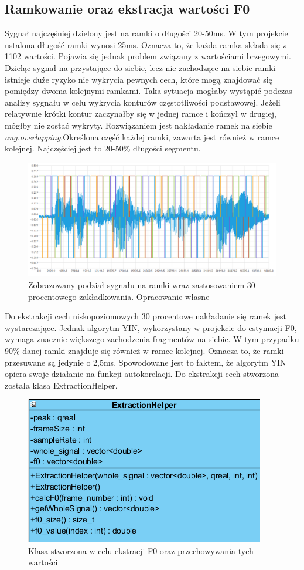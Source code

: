 \documentclass[a4paper,12 pt]{report}
\begin{document}
\subsection{Ramkowanie oraz ekstracja wartości F0}
Sygnał najczęśniej dzielony jest na ramki o długości 20-50ms. W tym projekcie ustalona długość ramki wynosi 25ms. Oznacza to, że każda ramka składa się z 1102 wartości.
Pojawia się jednak problem związany z wartościami brzegowymi. Dzieląc sygnał na przystające do siebie, lecz nie zachodzące na siebie ramki istnieje duże ryzyko nie wykrycia pewnych cech, które mogą znajdować się pomiędzy dwoma kolejnymi ramkami. 
Taka sytuacja mogłaby wystąpić podczas analizy sygnału w celu wykrycia konturów częstotliwości podstawowej. Jeżeli relatywnie krótki kontur zaczynałby się w jednej ramce i kończył w drugiej, mógłby nie zostać wykryty.
Rozwiązaniem jest nakładanie ramek na siebie \textit{ang.overlapping}.Określona część każdej ramki, zawarta jest również w ramce kolejnej. Najczęściej jest to 20-50\% długości segmentu.
\begin{figure}[h]
\includegraphics[scale=0.7]{overlapping.png}
\caption{Zobrazowany podział sygnału na ramki wraz zastosowaniem 30-procentowego zakładkowania. Opracowanie własne}
\end{figure}
\FloatBarrier
Do ekstrakcji cech niskopoziomowych 30 procentowe nakładanie się ramek jest wystarczające. Jednak algorytm YIN, wykorzystany w projekcie do estymacji F0, wymaga znacznie większego zachodzenia fragmentów na siebie. W tym przypadku 90\% danej ramki znajduje się również w ramce kolejnej.
Oznacza to, że ramki przesuwane są jedynie o 2,5ms. Spowodowane jest to faktem, że algorytm YIN opiera swoje działanie na funkcji autokorelacji.
Do ekstrakcji cech stworzona została klasa ExtractionHelper.
\FloatBarrier
\begin{figure}[h]
\centering
\includegraphics[scale=0.9]{featuresExtractor.png}
\caption{Klasa stworzona w celu ekstracji F0 oraz przechowywania tych wartości}
\end{figure}
\end{document}
